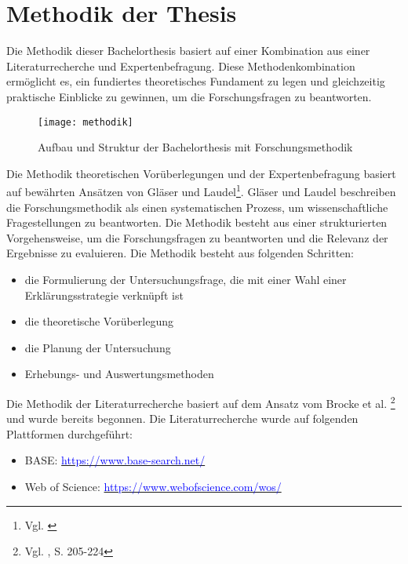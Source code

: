 
\section{Methodik der Thesis}

Die Methodik dieser Bachelorthesis basiert auf einer Kombination aus einer Literaturrecherche und Expertenbefragung. Diese Methodenkombination ermöglicht es, ein fundiertes theoretisches Fundament zu legen und gleichzeitig praktische Einblicke zu gewinnen, um die Forschungsfragen zu beantworten.

\begin{figure}[H]
    \centering
    \caption{Aufbau und Struktur der Bachelorthesis mit Forschungsmethodik}
    \texttt{[image: methodik]}
    \captionsetup{font=scriptsize}
    \label{fig:methodik}
\end{figure}

Die Methodik theoretischen Vorüberlegungen und der Expertenbefragung basiert auf bewährten Ansätzen von Gläser und Laudel\footnote{Vgl. \cite{Glaeser2010}}. Gläser und Laudel beschreiben die Forschungsmethodik als einen systematischen Prozess, um wissenschaftliche Fragestellungen zu beantworten. Die Methodik besteht aus einer strukturierten Vorgehensweise, um die Forschungsfragen zu beantworten und die Relevanz der Ergebnisse zu evaluieren. Die Methodik besteht aus folgenden Schritten: 
\begin{itemize}
    \item die Formulierung der Untersuchungsfrage, die mit einer Wahl einer Erklärungsstrategie verknüpft ist
    \item die theoretische Vorüberlegung
    \item die Planung der Untersuchung
    \item Erhebungs- und Auswertungsmethoden
\end{itemize}

Die Methodik der Literaturrecherche basiert auf dem Ansatz vom Brocke et al. \footnote{Vgl. \cite{Brocke2009}, S. 205-224}
und wurde bereits begonnen. Die Literaturrecherche wurde auf folgenden Plattformen durchgeführt:

\begin{itemize}
    \item BASE: \underline{\textcolor{blue}{https://www.base-search.net/}}
    \item Web of Science: \underline{\textcolor{blue}{https://www.webofscience.com/wos/}}
\end{itemize}

